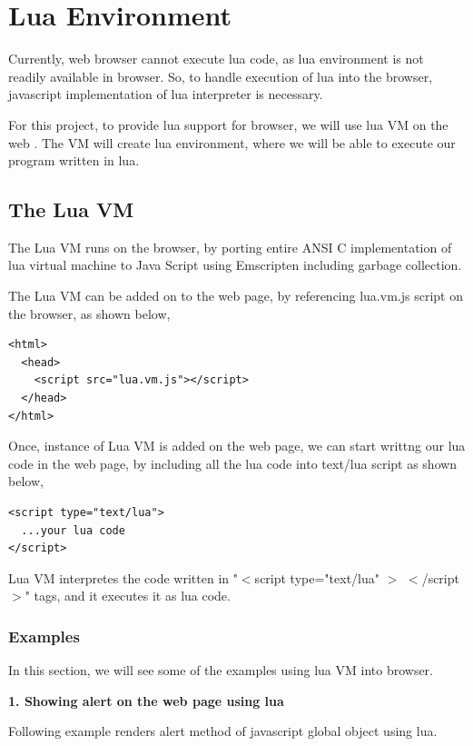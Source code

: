 \chapter{Lua Environment} \label{lua}

Currently, web browser cannot execute lua code, as lua environment is not readily available in browser. So, to handle execution of lua into the browser, javascript implementation of lua interpreter is necessary. 

For this project, to provide lua support for browser, we will use lua VM on the web \cite{luavm}. The VM will create lua environment, where we will be able to execute our program written in lua.

\section{The Lua VM}

The Lua VM runs on the browser, by porting entire ANSI C implementation of lua virtual machine to Java Script using Emscripten \cite{emscripten} including garbage collection.

The Lua VM can be added on to the web page, by referencing lua.vm.js script on the browser, as shown below, 


\begin{lstlisting}[frame=single]  
<html>
  <head>
    <script src="lua.vm.js"></script>
  </head>
</html>
\end{lstlisting}

Once, instance of Lua VM is added on the web page, we can start writtng our lua code in the web page, by including all the lua code into text/lua script as shown below, 

\begin{lstlisting}[frame=single]  
<script type="text/lua">
  ...your lua code
</script>
\end{lstlisting}

Lua VM interpretes the code written in "$<$script type="text/lua" $>$ $<$/script$>$" tags, and it executes it as lua code.

\subsection{Examples}

In this section, we will see some of the examples using lua VM into browser.

\textbf{1. Showing alert on the web page using lua}

Following example renders alert method of javascript global object using lua.  

